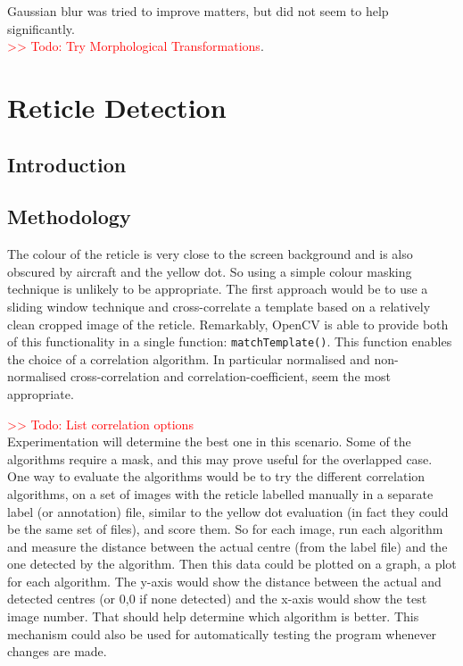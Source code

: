 \documentclass[final]{cmpreport_02}
\begin{document}
Gaussian blur was tried to improve matters, but did not seem to help significantly.\\
\textcolor{red}{>> Todo: Try Morphological Transformations}.\\


\section{Reticle Detection}

\subsection{Introduction}



\subsection{Methodology}

The colour of the reticle is very close to the screen background and is also obscured by aircraft and the yellow dot. So using a simple colour masking technique is unlikely to be appropriate. The first approach would be to use a sliding window technique and cross-correlate a template based on a relatively clean cropped image of the reticle. Remarkably, OpenCV is able to provide both of this functionality in a single function: \verb|matchTemplate()|. This function enables the choice of a correlation algorithm. In particular normalised and non-normalised cross-correlation and correlation-coefficient, seem the most appropriate.

\noindent
\textcolor{red}{>> Todo: List correlation options}\\
Experimentation will determine the best one in this scenario. Some of the algorithms require a mask, and this may prove useful for the overlapped case. One way to evaluate the algorithms would be to try the different correlation algorithms, on a set of images with the reticle labelled manually in a separate label (or annotation) file, similar to the yellow dot evaluation (in fact they could be the same set of files), and score them. So for each image, run each algorithm and measure the distance between the actual centre (from the label file) and the one detected by the algorithm. Then this data could be plotted on a graph, a plot for each algorithm. The y-axis would show the distance between the actual and detected centres (or 0,0 if none detected) and the x-axis would show the test image number. That should help determine which algorithm is better. This mechanism could also be used for automatically testing the program whenever changes are made.
\end{document}
